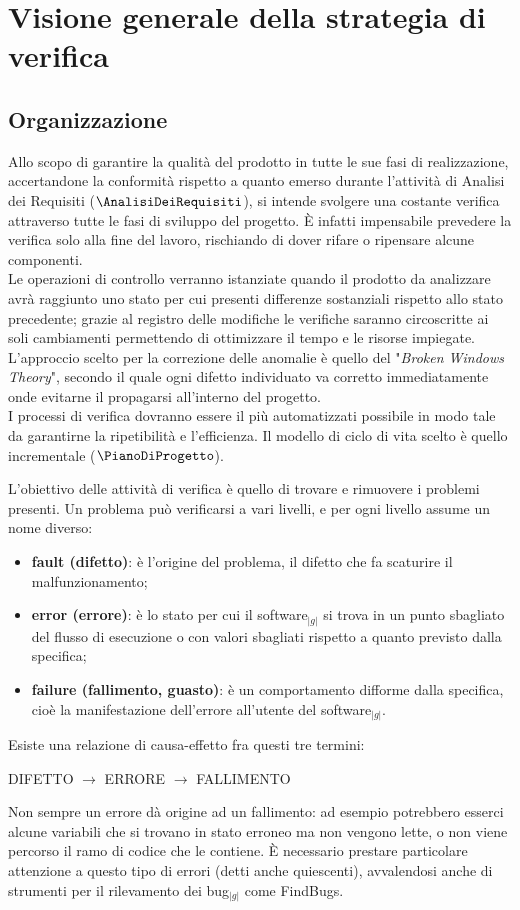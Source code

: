 \section{Visione generale della strategia di verifica}{
	\subsection{Organizzazione}{
		Allo scopo di garantire la qualità del prodotto in tutte le sue fasi di realizzazione, accertandone la conformità rispetto a 
		quanto emerso durante l'attività di Analisi dei Requisiti ($\AnalisiDeiRequisiti$), si intende svolgere una costante 
		verifica attraverso tutte le fasi di sviluppo del progetto. È infatti impensabile prevedere la verifica solo alla fine del lavoro, 
		rischiando di dover rifare o ripensare alcune componenti.\\
		Le operazioni di controllo verranno istanziate quando il prodotto da analizzare avrà raggiunto uno stato per cui presenti 
		differenze sostanziali rispetto allo stato precedente; grazie al registro delle modifiche le verifiche saranno circoscritte 
		ai soli cambiamenti permettendo di ottimizzare il tempo e le risorse impiegate.\\
		L'approccio scelto per la correzione delle anomalie è quello del "\textit{Broken Windows Theory}", secondo il quale ogni difetto 
		individuato va corretto immediatamente onde evitarne il propagarsi all'interno del progetto.\\
		I processi di verifica dovranno essere il più automatizzati possibile in modo tale da garantirne la ripetibilità e l'efficienza.
		Il modello di ciclo di vita scelto è quello incrementale ($\PianoDiProgetto$).

		L’obiettivo delle attività di verifica è quello di trovare e rimuovere i problemi presenti. Un problema può verificarsi a vari 
		livelli, e per ogni livello assume un nome diverso:
		\begin{itemize}
			\item \textbf{fault (difetto)}: è l’origine del problema, il difetto che fa scaturire il malfunzionamento;
			\item \textbf{error (errore)}:  è lo stato per cui il software$_{|g|}$ si trova in un punto sbagliato del flusso di 
			      esecuzione o con valori sbagliati rispetto a quanto previsto dalla specifica;
			\item \textbf{failure (fallimento, guasto)}: è un comportamento difforme dalla specifica, cioè la manifestazione 
			      dell’errore all’utente del software$_{|g|}$.
		\end{itemize}
		Esiste una relazione di causa-effetto fra questi tre termini:
		\begin{center}
			DIFETTO $\longrightarrow$ ERRORE $\longrightarrow$ FALLIMENTO
		\end{center}
		Non sempre un errore dà origine ad un fallimento: ad esempio potrebbero esserci alcune variabili che si trovano in stato erroneo 
		ma non vengono lette, o non viene percorso il ramo di codice che le contiene. È  necessario prestare particolare attenzione a 
		questo tipo di errori (detti anche quiescenti), avvalendosi anche di strumenti per il rilevamento dei bug$_{|g|}$ come FindBugs.

}}
